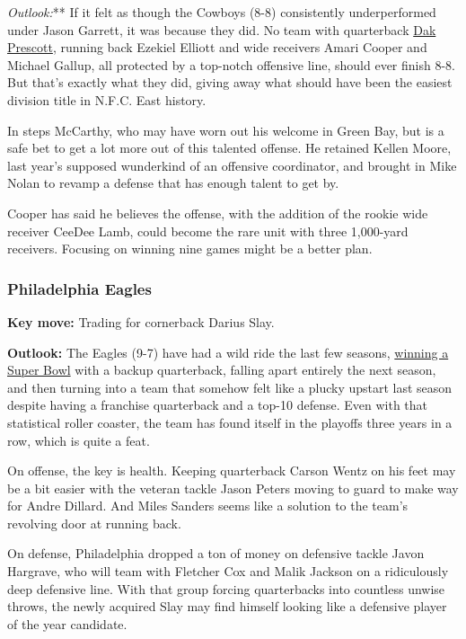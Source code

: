 \emph{\emph{Outlook}:}** If it felt as though the Cowboys (8-8)
consistently underperformed under Jason Garrett, it was because they
did. No team with quarterback
\href{https://www.nytimes3xbfgragh.onion/2017/01/11/sports/football/cowboys-dak-prescott-can-handle-any-kind-of-pressure.html}{Dak
Prescott}, running back Ezekiel Elliott and wide receivers Amari Cooper
and Michael Gallup, all protected by a top-notch offensive line, should
ever finish 8-8. But that's exactly what they did, giving away what
should have been the easiest division title in N.F.C. East history.

In steps McCarthy, who may have worn out his welcome in Green Bay, but
is a safe bet to get a lot more out of this talented offense. He
retained Kellen Moore, last year's supposed wunderkind of an offensive
coordinator, and brought in Mike Nolan to revamp a defense that has
enough talent to get by.

Cooper has said he believes the offense, with the addition of the rookie
wide receiver CeeDee Lamb, could become the rare unit with three
1,000-yard receivers. Focusing on winning nine games might be a better
plan.

\hypertarget{philadelphia-eagles}{%
\subsubsection{\texorpdfstring{\textbf{Philadelphia
Eagles}}{Philadelphia Eagles}}\label{philadelphia-eagles}}

\textbf{Key move:} Trading for cornerback Darius Slay.

\textbf{Outlook:} The Eagles (9-7) have had a wild ride the last few
seasons,
\href{https://www.nytimes3xbfgragh.onion/2018/02/04/sports/eagles-super-bowl-champions.html}{winning
a Super Bowl} with a backup quarterback, falling apart entirely the next
season, and then turning into a team that somehow felt like a plucky
upstart last season despite having a franchise quarterback and a top-10
defense. Even with that statistical roller coaster, the team has found
itself in the playoffs three years in a row, which is quite a feat.

On offense, the key is health. Keeping quarterback Carson Wentz on his
feet may be a bit easier with the veteran tackle Jason Peters moving to
guard to make way for Andre Dillard. And Miles Sanders seems like a
solution to the team's revolving door at running back.

On defense, Philadelphia dropped a ton of money on defensive tackle
Javon Hargrave, who will team with Fletcher Cox and Malik Jackson on a
ridiculously deep defensive line. With that group forcing quarterbacks
into countless unwise throws, the newly acquired Slay may find himself
looking like a defensive player of the year candidate.

